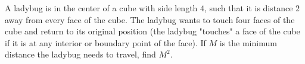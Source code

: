 A ladybug is in the center of a cube with side length $4$, such that it is distance $2$ away from every face of the cube. The ladybug wants to touch four faces of the cube and return to its original position (the ladybug "touches" a face of the cube if it is at any interior or boundary point of the face). If $M$ is the minimum distance the ladybug needs to travel, find $M^2$.
